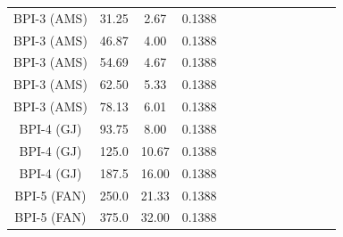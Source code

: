 \documentclass[8.5pt,twoside,twocolumn]{article}
\begin{document}
{\begin{table}[htpb]
\begin{tabular}{|c||c|| c || c || c |c |c||c| c| c||c| c| c|}
\hline
BPI-3 (AMS) &31.25 &2.67 & 0.1388 & & & & & & & & & \\
BPI-3 (AMS) &46.87 &4.00 & 0.1388 & & & & & & & & & \\
BPI-3 (AMS) &54.69 &4.67 & 0.1388 & & & & & & & & & \\
BPI-3 (AMS) &62.50 &5.33 & 0.1388 & & & & & & & & & \\
BPI-3 (AMS) &78.13 &6.01 & 0.1388 & & & & & & & & & \\
\hline
BPI-4 (GJ) &93.75 &8.00 & 0.1388 & & & & & & & & & \\
BPI-4 (GJ) &125.0 &10.67 & 0.1388 & & & & & & & & & \\
BPI-4 (GJ) &187.5 &16.00 & 0.1388 & & & & & & & & & \\
\hline
BPI-5 (FAN) & 250.0 &21.33 & 0.1388 & & & & & & & & & \\
BPI-5 (FAN) & 375.0 &32.00 & 0.1388 & & & & & & & & & \\
\hline


\end{tabular}
\end{table}}
\end{document}
